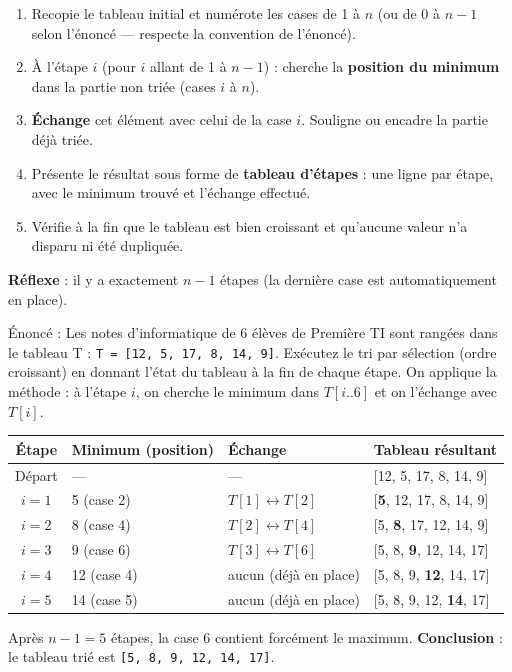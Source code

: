 \documentclass[11pt]{article}
\newcounter{popsec}
\newcounter{popsub}
\newcommand{\courssub}[1]{%
  \stepcounter{popsub}%
  \par\vspace{9pt}\noindent{\popxbold\fontsize{11.5}{13}\selectfont\color{popink}{\color{poporange}\thepopsec.\thepopsub}\hspace{6pt}#1}\par\nopagebreak\vspace{4pt}
}
\begin{document}
\courssub{Exécuter le tri par sélection}

\begin{methode}
\begin{enumerate}
  \item Recopie le tableau initial et numérote les cases de 1 à $n$ (ou de 0 à $n-1$ selon l'énoncé — respecte la convention de l'énoncé).
  \item À l'étape $i$ (pour $i$ allant de 1 à $n-1$) : cherche la \textbf{position du minimum} dans la partie non triée (cases $i$ à $n$).
  \item \textbf{Échange} cet élément avec celui de la case $i$. Souligne ou encadre la partie déjà triée.
  \item Présente le résultat sous forme de \textbf{tableau d'étapes} : une ligne par étape, avec le minimum trouvé et l'échange effectué.
  \item Vérifie à la fin que le tableau est bien croissant et qu'aucune valeur n'a disparu ni été dupliquée.
\end{enumerate}
\textbf{Réflexe} : il y a exactement $n-1$ étapes (la dernière case est automatiquement en place).
\end{methode}

\begin{exoresolu}
Énoncé : Les notes d'informatique de 6 élèves de Première TI sont rangées dans le tableau T : \texttt{T = [12, 5, 17, 8, 14, 9]}. Exécutez le tri par sélection (ordre croissant) en donnant l'état du tableau à la fin de chaque étape.
\tcblower
On applique la méthode : à l'étape $i$, on cherche le minimum dans $T[i..6]$ et on l'échange avec $T[i]$.

\begin{center}
\begin{tabularx}{\linewidth}{|c|l|X|l|}
\hline
\rowcolor{popblueL} Étape & Minimum (position) & Échange & Tableau résultant \\
\hline
Départ & --- & --- & [12, 5, 17, 8, 14, 9] \\
\hline
$i=1$ & 5 (case 2) & $T[1] \leftrightarrow T[2]$ & [\textbf{5}, 12, 17, 8, 14, 9] \\
\hline
$i=2$ & 8 (case 4) & $T[2] \leftrightarrow T[4]$ & [5, \textbf{8}, 17, 12, 14, 9] \\
\hline
$i=3$ & 9 (case 6) & $T[3] \leftrightarrow T[6]$ & [5, 8, \textbf{9}, 12, 14, 17] \\
\hline
$i=4$ & 12 (case 4) & aucun (déjà en place) & [5, 8, 9, \textbf{12}, 14, 17] \\
\hline
$i=5$ & 14 (case 5) & aucun (déjà en place) & [5, 8, 9, 12, \textbf{14}, 17] \\
\hline
\end{tabularx}
\end{center}

Après $n-1 = 5$ étapes, la case 6 contient forcément le maximum. \textbf{Conclusion} : le tableau trié est \texttt{[5, 8, 9, 12, 14, 17]}.
\end{exoresolu}
\end{document}
